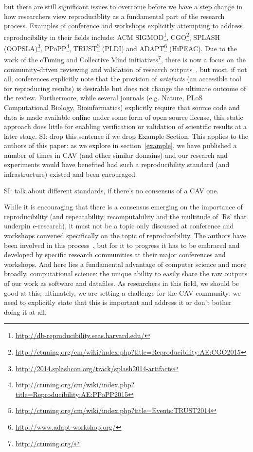 \documentclass{llncs}
\begin{document}
 but there are still significant issues to overcome before we
have a step change in how researchers view reproduciblity as a
fundamental part of the research process. Examples of conference and
workshops explicitly attempting to address reproducibility in their
fields include: ACM
SIGMOD\footnote{\url{http://db-reproducibility.seas.harvard.edu/}},
CGO\footnote{\url{http://ctuning.org/cm/wiki/index.php?title=Reproducibility:AE:CGO2015}},
SPLASH
(OOPSLA)\footnote{\url{http://2014.splashcon.org/track/splash2014-artifacts}},
PPoPP\footnote{\url{http://ctuning.org/cm/wiki/index.php?title=Reproducibility:AE:PPoPP2015}},
TRUST\footnote{\url{http://ctuning.org/cm/wiki/index.php?title=Events:TRUST2014}}
(PLDI) and ADAPT\footnote{\url{http://www.adapt-workshop.org/}}
(HiPEAC). Due to the work of the cTuning and Collective Mind
initiatives\footnote{\url{http://ctuning.org/}}, there is now a focus
on the community-driven reviewing and validation of research
outputs~\cite{fursin+dubach:2014}, but most, if not all, conferences
explicitly note that the provision of \emph{artefacts} (an accessible
tool for reproducing results) is desirable but does not change the
ultimate outcome of the review.  Furthermore, while several journals
(e.g. Nature, PLoS Computational Biology, Bioinformatics) explicitly
require that source code and data is made available online under some
form of open source license, this static approach does little for
enabling verification or validation of scientific results at a later
stage. 
SI: drop this sentence if we drop Example Section.
This applies to the authors of this paper: as we explore in
section~\ref{example}, we have published a number of times in CAV (and
other similar domains) and our research and experiments would have
benefited had such a reproducibility standard (and infrastructure)
existed and been encouraged.

SI: talk about different standards, if there's no consensus of a CAV one. 


While it is encouraging that there is a consensus emerging on the
importance of reproducibility (and repeatability, recomputability and
the multitude of `Rs' that underpin e-research), it must not be a
topic only discussed at conference and workshops convened specifically
on the topic of reproducibility. The authors have been involved in
this process~\cite{crick+chuehong:2014}, but for it to progress it has
to be embraced and developed by specific research communities at their
major conferences and workshops. And here lies a fundamental advantage
of computer science and more broadly, computational science: the
unique ability to easily share the raw outputs of our work as software
and datafiles. As researchers in this field, we should be good at
this; ultimately, we are setting a challenge for the CAV community: we
need to explicitly state that this is important and address it or
don't bother doing it at all.
\end{document}
